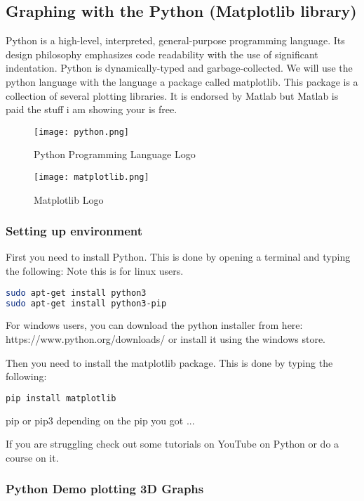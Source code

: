 \subsection{Graphing with the Python (Matplotlib library)}

Python is a high-level, interpreted, general-purpose programming language. Its design philosophy emphasizes code readability with the use of significant indentation. Python is dynamically-typed and garbage-collected.
We will use the python language with the language a package called matplotlib. This package is a collection of several plotting libraries. It is endorsed by Matlab but Matlab is paid the stuff i am showing your is free.


\begin{figure}[htb]
\centering
\texttt{[image: python.png]}
\caption{Python Programming Language Logo}
\label{fig:python}
\end{figure}

\begin{figure}[htb]
\centering
\texttt{[image: matplotlib.png]}
\caption{Matplotlib Logo}
\label{fig:matplotlib}
\end{figure}
    
\subsubsection{Setting up environment}

First you need to install Python. This is done by opening a terminal and typing the following:
Note this is for linux users.
\begin{lstlisting}[language=bash]
sudo apt-get install python3    
sudo apt-get install python3-pip
\end{lstlisting}

For windows users, you can download the python installer from here: https://www.python.org/downloads/ or install it using the windows store.

Then you need to install the matplotlib package. This is done by typing the following:
\begin{lstlisting}[language=bash]
pip install matplotlib
\end{lstlisting}

pip or pip3 depending on the pip you got ...

If you are struggling check out some tutorials on YouTube on Python or do a course on it.

\subsubsection{Python Demo plotting 3D Graphs}



